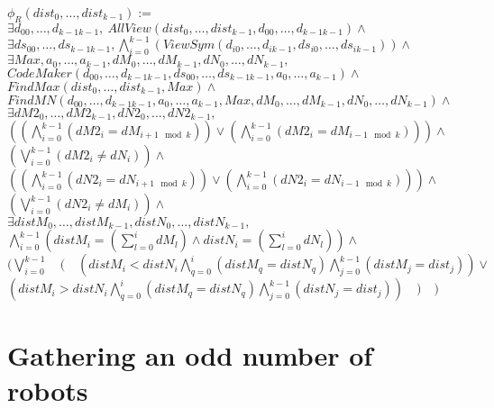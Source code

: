 \documentclass{article}
\begin{document}
\begin{center}

$\phi_R(dist_{0}, \ldots ,dist_{k-1}):=$\\
$\exists d_{00}, \ldots ,d_{k-1k-1},\ AllView(dist_{0}, \ldots ,dist_{k-1}, d_{00}, \ldots ,d_{k-1k-1})\land$\\
$\exists ds_{00}, \ldots ,ds_{k-1k-1}, \bigwedge_{i=0}^{k-1} (ViewSym(d_{i0}, \ldots , d_{ik-1}, ds_{i0}, \ldots , ds_{ik-1}))\land$\\
$\exists Max, a_{0}, \ldots , a_{k-1}, dM_{0}, \dots, dM_{k-1}, dN_{0}, \dots, dN_{k-1},$\\
$CodeMaker(d_{00}, \ldots ,d_{k-1k-1}, ds_{00}, \ldots ,ds_{k-1k-1}, a_{0}, \ldots , a_{k-1})\land$\\
$FindMax(dist_{0}, \ldots ,dist_{k-1}, Max) \land$\\
$FindMN(d_{00}, \ldots ,d_{k-1k-1}, a_{0}, \ldots , a_{k-1}, Max,  dM_{0}, \dots, dM_{k-1}, dN_{0}, \dots, dN_{k-1}) \land $\\
$\exists dM2_{0}, \dots, dM2_{k-1}, dN2_{0}, \dots, dN2_{k-1},$\\
$( (\bigwedge_{i = 0}^{k-1} (dM2_{i} = dM_{i+1 \mod{k}}) ) \lor (\bigwedge_{i = 0}^{k-1} (dM2_{i} = dM_{i-1 \mod{k}})) ) \land$\\
$(\bigvee_{i = 0}^{k-1} (dM2_{i} \not= dN_{i}) ) \land $\\
$( (\bigwedge_{i = 0}^{k-1} (dN2_{i} = dN_{i+1 \mod{k}}) ) \lor (\bigwedge_{i = 0}^{k-1} (dN2_{i} = dN_{i-1 \mod{k}})) ) \land$\\
$(\bigvee_{i = 0}^{k-1} (dN2_{i} \not= dM_{i}) ) \land $\\

$\exists distM_{0}, \ldots , distM_{k-1}, distN_{0}, \ldots , distN_{k-1},$\\
$\bigwedge_{i=0}^{k-1}(distM_{i} = (\sum_{l=0}^i dM_{l}) \land distN_{i} = (\sum_{l=0}^i dN_{l}) ) \land $\\
$(\bigvee_{i=0}^{k-1}\quad (\quad (distM_{i} < distN_{i} \bigwedge_{q=0}^{i} (distM_{q} = distN_{q}) \bigwedge_{j = 0}^{k-1} (distM_{j} = dist_{j}) ) \lor $\\
$(distM_{i} > distN_{i} \bigwedge_{q=0}^{i} (distM_{q} = distN_{q}) \bigwedge_{j = 0}^{k-1} (distN_{j} = dist_{j}) )\quad )\quad )$
\end{center}

\section{Gathering an odd number of robots}
\end{document}
